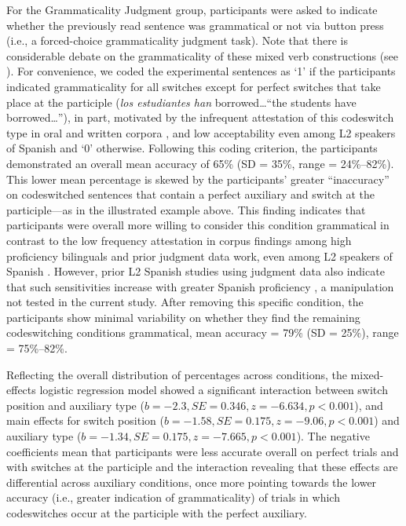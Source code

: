 \documentclass[output=paper,colorlinks,citecolor=brown]{langscibook}
\begin{document}
For the Grammaticality Judgment group, participants were asked to indicate whether the previously read sentence was grammatical or not via button press (i.e., a forced-choice grammaticality judgment task). Note that there is considerable debate on the grammaticality of these mixed verb constructions (see \cite{Balametal2020,Giancaspro2015,GuzzardoTamargoetal2016}). For convenience, we coded the experimental sentences as `1' if the participants indicated grammaticality for all switches except for perfect switches that take place at the participle (\textit{los estudiantes han} borrowed\ldots ``the students have borrowed\ldots''), in part, motivated by the infrequent attestation of this codeswitch type in oral and written corpora \citep{GuzzardoTamargoetal2016}, and low acceptability even among L2 speakers of Spanish \citep{Giancaspro2015} and `0' otherwise. Following this coding criterion, the participants demonstrated an overall mean accuracy of 65\% (SD = 35\%, range = 24\%--82\%). This lower mean percentage is skewed by the participants’ greater ``inaccuracy'' on codeswitched sentences that contain a perfect auxiliary and switch at the participle---as in the illustrated example above. This finding indicates that participants were overall more willing to consider this condition grammatical in contrast to the low frequency attestation in corpus findings among high proficiency bilinguals and prior judgment data work, even among L2 speakers of Spanish \citep{Giancaspro2015}. However, prior L2 Spanish studies using judgment data also indicate that such sensitivities increase with greater Spanish proficiency \citep{Giancaspro2015,Koronkiewicz2018}, a manipulation not tested in the current study. After removing this specific condition, the participants show minimal variability on whether they find the remaining codeswitching conditions grammatical, mean accuracy = 79\% (SD = 25\%), range = 75\%--82\%.

Reflecting the overall distribution of percentages across conditions, the mixed-effects logistic regression model showed a significant interaction between switch position and auxiliary type ($b = -2.3, SE = 0.346, z = -6.634, p < 0.001$), and main effects for switch position ($b = -1.58, SE = 0.175, z = -9.06, p < 0.001$) and auxiliary type ($b = -1.34, SE = 0.175, z = -7.665, p < 0.001$). The negative coefficients mean that participants were less accurate overall on perfect trials and with switches at the participle and the interaction revealing that these effects are differential across auxiliary conditions, once more pointing towards the lower accuracy (i.e., greater indication of grammaticality) of trials in which codeswitches occur at the participle with the perfect auxiliary.
\end{document}
